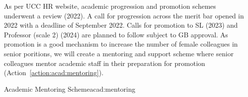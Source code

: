 


As per UCC HR website, academic progression and promotion schemes underwent a review (2022). A call for progression across the merit bar opened in 2022 with a deadline of September 2022. Calls for promotion to SL (2023) and Professor (scale 2) (2024) are planned to follow subject to GB approval.
As promotion is a good mechanism to increase the number of female colleagues in senior poritions, we will create a mentoring and support scheme where senior colleagues mentor academic staff in their preparation for promotion (Action~\ref{action:acad:mentoring}). 


\begin{actionblock}{\ksspace{}Academic Mentoring Scheme}{acad:mentoring}
\actmentorpromotion
\hfill{
    \hypersetup{hidelinks}
    \hyperlink{c10}{\gotoactionsymbol{}}
}
\end{actionblock}



%




